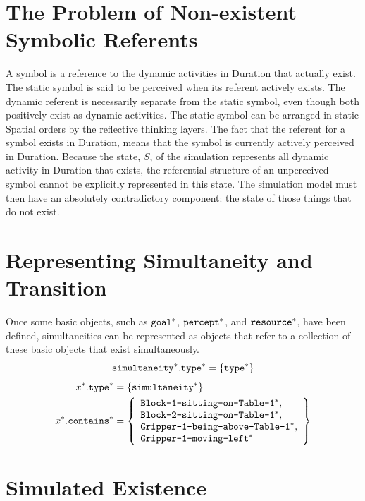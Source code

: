 \section{The Problem of Non-existent Symbolic Referents}

A symbol is a reference to the dynamic activities in Duration that
actually exist.  The static symbol is said to be perceived when its
referent actively exists.  The dynamic referent is necessarily
separate from the static symbol, even though both positively exist as
dynamic activities.  The static symbol can be arranged in static
Spatial orders by the reflective thinking layers.  The fact that the
referent for a symbol exists in Duration, means that the symbol is
currently actively perceived in Duration.  Because the state, $S$, of
the simulation represents all dynamic activity in Duration that
exists, the referential structure of an unperceived symbol cannot be
explicitly represented in this state.  The simulation model must then
have an absolutely contradictory component: the state of those things
that do not exist.

\section{Representing Simultaneity and Transition}

Once some basic objects, such as $\text{\tt{goal}}^*$,
$\text{\tt{percept}}^*$, and $\text{\tt{resource}}^*$, have been
defined, simultaneities can be represented as objects that refer to a
collection of these basic objects that exist simultaneously.
\begin{equation}
\text{\tt{simultaneity}}^*.\text{\tt{type}}^* = \{\text{\tt{type}}^*\} \\
\end{equation}
\begin{align}
    x^*.\text{\tt{type}}^* &= \{\text{\tt{simultaneity}}^*\} \\
x^*.\text{\tt{contains}}^* &=
  \left\{
    \begin{array}{l}
      \text{\tt{Block-1-sitting-on-Table-1}}^*, \\
      \text{\tt{Block-2-sitting-on-Table-1}}^*, \\
      \text{\tt{Gripper-1-being-above-Table-1}}^*, \\
      \text{\tt{Gripper-1-moving-left}}^*
    \end{array}
  \right\}
\end{align}

\section{Simulated Existence}

